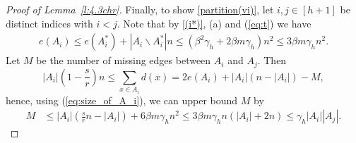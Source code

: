 \documentclass[reqno, 12pt]{amsart}
\numberwithin{equation}{section}
\numberwithin{figure}{section}
\theoremstyle{plain}
\theoremstyle{definition}
\let\setminus=\smallsetminus
\begin{document}
\begin{proof}[Proof of Lemma~\ref{l:4.3chr}]
    Finally, to show \ref{partition(vi)}, let $i,j\in[h+1]$ be distinct indices with $i < j$. Note that by \ref{(i*)}, (a) and (\ref{eq:t}) we have
    \begin{align*}
        e(A_i) \leq e(A_i^*) + |A_i\setminus A_i^*|n \leq (\beta^2\gamma_h+2\beta m\gamma_h)n^2 \leq 3\beta m \gamma_h n^2.
    \end{align*}
    Let $M$ be the number of missing edges between $A_i$ and $A_j$. Then
    \[ |A_i|\left(1-\frac{s}{r}\right)n \leq \sum_{x\in A_i} d(x) = 2e(A_i) + |A_i|(n-|A_i|) - M,\]
    hence, using (\ref{eq:size_of_A_i}), we can upper bound $M$ by
    \begin{align*}
        M & \leq |A_i| \left( \frac{s}{r}n - |A_i|\right) + 6\beta m\gamma_h n^2 \leq 3\beta m \gamma_h n (|A_i| + 2n) \leq \gamma_h|A_i||A_j|.
    \end{align*}
    
        
    \end{proof}
	

  
    
\end{document}

